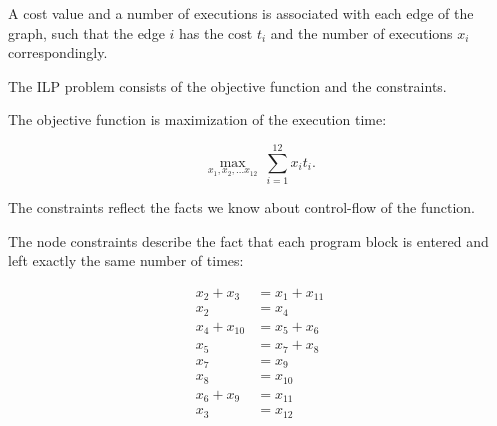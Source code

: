 \documentclass[12pt,a4paper,titlepage,oneside]{article}
\begin{document}
\begin{itemize}


















A cost value and a number of executions is associated with each edge of the graph, such that the edge $i$ has the cost $t_i$ and the number of executions $x_i$ correspondingly.

The ILP problem consists of the objective function and the constraints.

The objective function is maximization of the execution time:

\begin{equation}
\max_{x_1, x_2, \ldots x_{12}} \ \sum_{i=1}^{12} x_i t_i.
\label{equ:objective}
\end{equation}


The constraints reflect the facts we know about control-flow of the function.

The node constraints describe the fact that each program block is entered and left exactly the same number of times:

\begin{equation}
\left.\begin{aligned}
x_2 + x_3 &= x_1 + x_{11}\\
x_2 &= x_4\\
x_4 + x_{10} &= x_5 + x_6\\
x_5 &= x_7 + x_8\\
x_7 &= x_9\\
x_8 &= x_{10}\\
x_6 + x_9 &= x_{11}\\
x_3 &= x_{12}
\end{aligned}\right.
\label{equ:node}
\end{equation}


\end{itemize}
\end{document}
